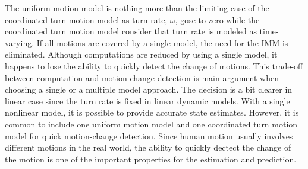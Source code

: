 \documentclass[letterpaper, 10 pt, conference]{ieeeconf}
\begin{document}
The uniform motion model is nothing more than the limiting case of the coordinated turn motion model as turn rate, $\omega$, gose to zero while the coordinated turn motion model consider that turn rate is modeled as time-varying. If all motions are covered by a single model, the need for the IMM is eliminated. Although computations are reduced by using a single model, it happens to lose the ability to quickly detect the change of motions. This trade-off between computation and motion-change detection is main argument when choosing a single or a multiple model approach. The decision is a bit clearer in linear case since the turn rate is fixed in linear dynamic models. With a single nonlinear model, it is possible to provide accurate state estimates. However, it is common to include one uniform motion model and one coordinated turn motion model for quick motion-change detection. Since human motion usually involves different motions in the real world, the ability to quickly dectect the change of the motion is one of the important properties for the estimation and prediction.          






\end{document}
